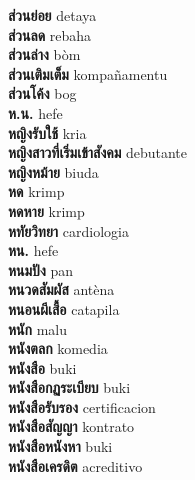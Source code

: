 \textbf{ ส่วนย่อย  } detaya \\
\textbf{ ส่วนลด  } rebaha \\
\textbf{ ส่วนล่าง  } bòm \\
\textbf{ ส่วนเติมเต็ม  } kompañamentu \\
\textbf{ ส่วนโค้ง  } bog \\
\textbf{ ห.น.  } hefe \\
\textbf{ หญิงรับใช้  } kria \\
\textbf{ หญิงสาวที่เริ่มเข้าสังคม  } debutante \\
\textbf{ หญิงหม้าย  } biuda \\
\textbf{ หด  } krimp \\
\textbf{ หดหาย  } krimp \\
\textbf{ หทัยวิทยา  } cardiologia \\
\textbf{ หน.  } hefe \\
\textbf{ หนมปัง  } pan \\
\textbf{ หนวดสัมผัส  } antèna \\
\textbf{ หนอนผีเสื้อ  } catapila \\
\textbf{ หนัก  } malu \\
\textbf{ หนังตลก  } komedia \\
\textbf{ หนังสือ  } buki \\
\textbf{ หนังสือกฏระเบียบ  } buki \\
\textbf{ หนังสือรับรอง  } certificacion \\
\textbf{ หนังสือสัญญา  } kontrato \\
\textbf{ หนังสือหนังหา  } buki \\
\textbf{ หนังสือเครดิต  } acreditivo \\
